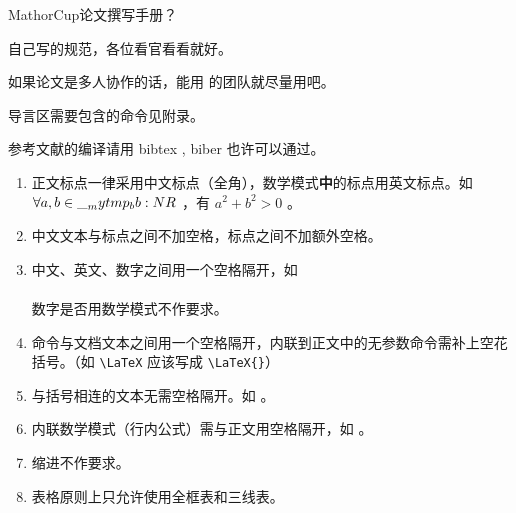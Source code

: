 \documentclass{MMCStyle}
\begin{document}
\begin{center}
\LARGE MathorCup论文撰写手册？\bigskip
\end{center}

 自己写的规范，各位看官看看就好。

如果论文是多人协作的话，能用  的团队就尽量用吧。

导言区需要包含的命令见附录。

参考文献的编译请用 bibtex , biber 也许可以通过。


\begin{enumerate}
    \item 正文标点一律采用中文标点（全角），数学模式\textbf{中}的标点用英文标点。如\\
      $\forall a, b \in\__mytmp_bb:N R$ ，有 $a^2 + b^2 > 0$ 。
    \item 中文文本与标点之间不加空格，标点之间不加额外空格。
    \item 中文、英文、数字之间用一个空格隔开，如\\
      \\
      数字是否用数学模式不作要求。
    \item 命令与文档文本之间用一个空格隔开，内联到正文中的无参数命令需补上空花括号。（如 \verb|\LaTeX| 应该写成 \verb|\LaTeX{}|）
    \item 与括号相连的文本无需空格隔开。如  。
    \item 内联数学模式（行内公式）需与正文用空格隔开，如  。
    \item 缩进不作要求。
    \item 表格原则上只允许使用全框表和三线表。
\end{enumerate}


\end{document}

